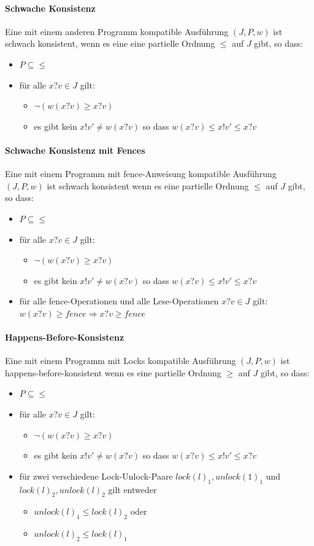 \documentclass[a4paper,10pt, oneside]{book}
\begin{document}
\paragraph{Schwache Konsistenz}
Eine mit einem anderen Programm kompatible Ausführung $(J,P,w)$ ist schwach konsistent, wenn es eine 
eine partielle Ordnung $\leq$ auf $J$ gibt, so dass:
\begin{itemize}
	\item $P \subseteq \leq$
	\item für alle $x?v \in J$ gilt:
	\begin{itemize}
		\item $\neg(w(x?v) \geq x?v)$
		\item es gibt kein $x!v' \not= w(x?v)$ so dass $w(x?v) \leq x!v' \leq x?v$
	\end{itemize}
\end{itemize}

\paragraph{Schwache Konsistenz mit Fences}
Eine mit einem Programm mit fence-Anweisung kompatible Ausführung $(J,P,w)$ ist schwach konsistent wenn es eine partielle Ordnung $\leq$ auf $J$ gibt, so dass:
\begin{itemize}
	\item $P \subseteq \leq$
	\item für alle $x?v \in J$ gilt:
	\begin{itemize}
		\item $\neg(w(x?v) \geq x?v)$
		\item es gibt kein $x!v' \not= w(x?v)$ so dass $w(x?v) \leq x!v' \leq x?v$
	\end{itemize}
	\item für alle fence-Operationen und alle Lese-Operationen $x?v \in J$ gilt: $w(x?v) \geq fence \Rightarrow x?v \geq fence$
\end{itemize}

\paragraph{Happens-Before-Konsistenz}
Eine mit einem Programm mit Locks kompatible Ausführung $(J,P,w)$ ist happens-before-konsistent wenn es eine partielle Ordnung $\geq$ auf $J$ gibt, so dass:
\begin{itemize}
	\item $P \subseteq \leq$
	\item für alle $x?v \in J$ gilt:
	\begin{itemize}
		\item $\neg(w(x?v) \geq x?v)$
		\item es gibt kein $x!v' \not= w(x?v)$ so dass $w(x?v) \leq x!v' \leq x?v$
	\end{itemize}
	\item für zwei verschiedene Lock-Unlock-Paare $lock(l)_1, unlock(1)_1$ und $lock(l)_2, unlock(l)_2$ gilt entweder
	\begin{itemize}
		\item $unlock(l)_1 \leq lock(l)_2$ oder
		\item $unlock(l)_2 \leq lock(l)_1$
	\end{itemize}
\end{itemize}
\end{document}
